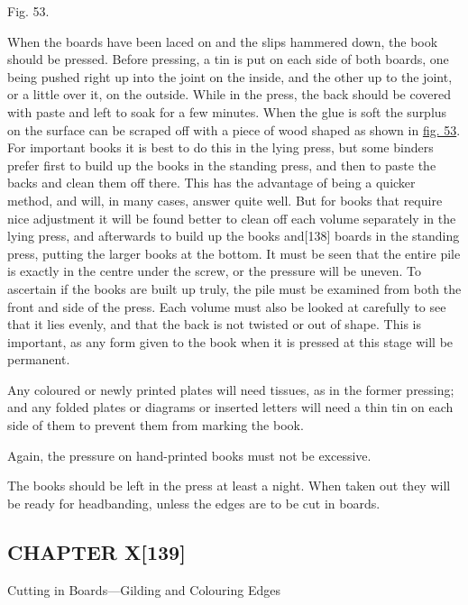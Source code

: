 \documentclass[
]{article}
\begin{document}
Fig. 53.

When the boards have been laced on and the slips hammered down, the book
should be pressed. Before pressing, a tin is put on each side of both
boards, one being pushed right up into the joint on the inside, and the
other up to the joint, or a little over it, on the outside. While in the
press, the back should be covered with paste and left to soak for a few
minutes. When the glue is soft the surplus on the surface can be scraped
off with a piece of wood shaped as shown in
\protect\hyperlink{Fig_53}{fig. 53}. For important books it is best to
do this in the lying press, but some binders prefer first to build up
the books in the standing press, and then to paste the backs and clean
them off there. This has the advantage of being a quicker method, and
will, in many cases, answer quite well. But for books that require nice
adjustment it will be found better to clean off each volume separately
in the lying press, and afterwards to build up the books
and{\protect\hypertarget{Page_138}{}{{[}138{]}}} boards in the standing
press, putting the larger books at the bottom. It must be seen that the
entire pile is exactly in the centre under the screw, or the pressure
will be uneven. To ascertain if the books are built up truly, the pile
must be examined from both the front and side of the press. Each volume
must also be looked at carefully to see that it lies evenly, and that
the back is not twisted or out of shape. This is important, as any form
given to the book when it is pressed at this stage will be permanent.

Any coloured or newly printed plates will need tissues, as in the former
pressing; and any folded plates or diagrams or inserted letters will
need a thin tin on each side of them to prevent them from marking the
book.

Again, the pressure on hand-printed books must not be excessive.

The books should be left in the press at least a night. When taken out
they will be ready for headbanding, unless the edges are to be cut in
boards.

\hypertarget{chapter-x139}{%
\subsection[CHAPTER
X]{\texorpdfstring{\protect\hypertarget{CHAPTER_X}{}{}CHAPTER
X{\protect\hypertarget{Page_139}{}{{[}139{]}}}}{CHAPTER X{[}139{]}}}\label{chapter-x139}}

Cutting in Boards---Gilding and Colouring Edges
\end{document}
